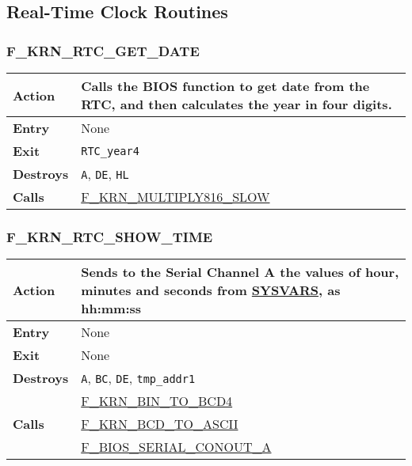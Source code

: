 \subsection{Real-Time Clock Routines}

    \subsubsection{F\_KRN\_RTC\_GET\_DATE}
    \label{func:fkrnrtcgetdate}
    \begin{tabular}{l p{9cm}}
        \hline\textbf{Action}
        & Calls the BIOS function to get date from the RTC, and then
        calculates the year in four digits. \\
        \hline\textbf{Entry} & None \\
        \hline\textbf{Exit} & \texttt{RTC\_year4}\\
        \hline\textbf{Destroys} & \texttt{A}, \texttt{DE}, \texttt{HL} \\
        \hline\textbf{Calls}
        & \hyperref[func:fkrnmultiply816slow]{F\_KRN\_MULTIPLY816\_SLOW}\\
        \hline
    \end{tabular}

    \subsubsection{F\_KRN\_RTC\_SHOW\_TIME}
    \label{func:fkrnrtcshowtime}
    \begin{tabular}{l p{9cm}}
        \hline\textbf{Action}
        & Sends to the \textbf{Serial Channel} A the values of hour, minutes
        and seconds from \hyperref[sec:ram_memmap]{SYSVARS}, as hh:mm:ss\\
        \hline\textbf{Entry} & None \\
        \hline\textbf{Exit} & None \\
        \hline\textbf{Destroys} & \texttt{A}, \texttt{BC}, \texttt{DE},
        \texttt{tmp\_addr1}\\
        \hline\multirow[t]{3}{4em}{\textbf{Calls}}
        & \hyperref[func:fkrnbintobcd4]{F\_KRN\_BIN\_TO\_BCD4}\\
        & \hyperref[func:fkrnbcdtoascii]{F\_KRN\_BCD\_TO\_ASCII}\\
        & \hyperref[func:fbiosserialconouta]{F\_BIOS\_SERIAL\_CONOUT\_A}\\
        \hline
    \end{tabular}

